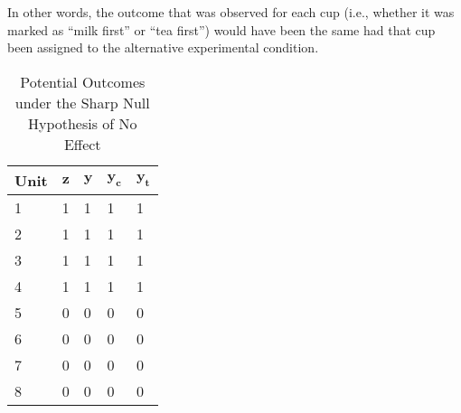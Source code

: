 \documentclass[12pt,leqno]{article}
\theoremstyle{newstyle}
\begin{document}
In other words, the outcome that was observed for each cup (i.e.,
whether it was marked as \enquote{milk first} or \enquote{tea first})
would have been the same had that cup been assigned to the alternative
experimental condition.

\begin{table}[H]
\centering
    \begin{tabular}{l|l|l|l|l}
    Unit & $\mathbf{z}$ & $\mathbf{y}$ & $\mathbf{y_c}$ & $\mathbf{y_t}$ \\ \hline
    1    & 1            & 1            & 1                & 1 \\
    2    & 1            & 1            & 1                & 1  \\
    3    & 1            & 1            & 1                & 1  \\
    4    & 1            & 1            & 1                & 1  \\
    5    & 0            & 0            & 0                & 0  \\
    6    & 0            & 0            & 0                & 0  \\
    7    & 0            & 0            & 0                & 0  \\
    8    & 0            & 0            & 0                & 0  \\
    \end{tabular}
    \caption{Potential Outcomes under the Sharp Null Hypothesis of No Effect}    
\end{table}
\end{document}
